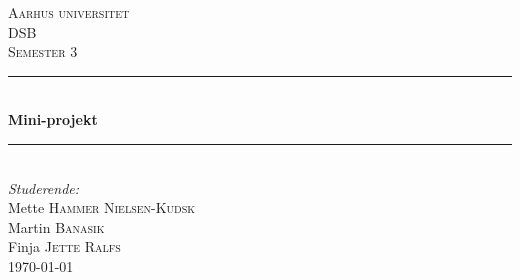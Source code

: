\documentclass[12pt, letterpaper]{article}
\begin{document}
\begin{titlepage}

\newcommand{\HRule}{\rule{\linewidth}{0.5mm}} %

\center %
 

\textsc{\LARGE Aarhus universitet}\\[1.5cm] %
\textsc{\Large DSB}\\[0.5cm] %
\textsc{\large Semester 3}\\[0.5cm] %


\HRule \\[0.4cm]
{ \huge \bfseries Mini-projekt}\\[0.4cm] %
\HRule \\[1.5cm]
 

\Large \emph{Studerende:}\\[1cm]
Mette \textsc{Hammer Nielsen-Kudsk}\\[0,5cm] %
Martin \textsc{Banasik}\\[0,5cm] %
Finja \textsc{Jette Ralfs}\\[0,5cm] %

{\large \today}\\[1,2cm] %



\end{titlepage}
\end{document}
